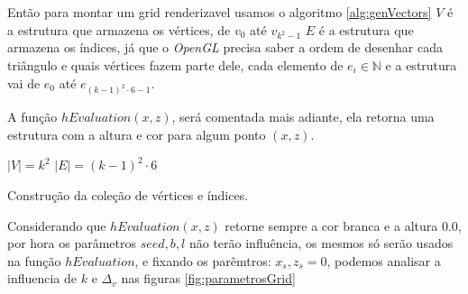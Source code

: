 Então para montar um grid renderizavel usamos o algoritmo \ref{alg:genVectors}
$V$ é a estrutura que armazena os vértices, de $v_{0}$ até $v_{k^2-1}$ 
$E$ é a estrutura que armazena os índices, já que o \textit{OpenGL} precisa
saber a ordem de desenhar cada triângulo e quais vértices fazem parte dele, 
cada elemento de $e_{i} \in \mathbb{N}$ e a estrutura vai de $e_{0}$ até $e_{(k-1)^2 \cdot 6 - 1}$.

A função \textit{$hEvaluation(x, z)$}, será comentada mais adiante, ela retorna uma estrutura
com a altura e cor para algum ponto $(x, z)$.
 
\begin{algorithm}[H]\label{alg:genVectors}
    $|V| = k^2$\;
    $|E| = (k-1)^2 \cdot 6$\;
    \caption{Construção da coleção de vértices e índices.}
\end{algorithm}

Considerando que \textit{$hEvaluation(x, z)$} retorne sempre a cor branca
e a altura $0.0$, por hora os parâmetros $seed, b, l$ não terão influência, os mesmos 
só serão usados na função \textit{$hEvaluation$}, e fixando os parêmtros: $x_{s}, z_{s} = 0$, 
podemos analisar a influencia de $k$ e $\Delta_{v}$ nas figuras \ref{fig:parametrosGrid}

